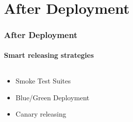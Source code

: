 \documentclass{beamer}
\begin{document}
\section{After Deployment}

\begin{frame}
	\frametitle{After Deployment}
	\framesubtitle{Smart releasing strategies}
\begin{columns}
 \begin{column}{.49\textwidth}
	\begin{itemize}
		\item Smoke Test Suites
		\item Blue/Green Deployment
		\item Canary releasing
	\end{itemize}
\end{column}
\begin{column}{.49\textwidth}
	\begin{figure}
		\begin{center}

\end{center}
\end{figure}
\end{column}
\end{columns}
\end{frame}
\end{document}
